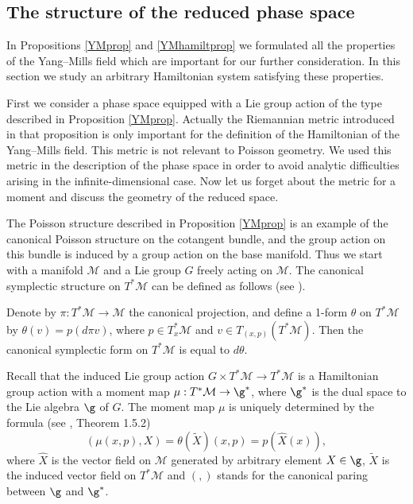 \documentclass{amsart}
\begin{document}


\subsection{The structure of the reduced phase space}\label{redcoord}



In Propositions \ref{YMprop} and \ref{YMhamiltprop} we formulated all the properties of the Yang--Mills field which are important for our further consideration. In this section we study an arbitrary Hamiltonian system satisfying these properties.

First we consider a phase space equipped with a Lie group action of the type
described in Proposition \ref{YMprop}. Actually
the Riemannian metric introduced in that proposition is only important for the definition of the Hamiltonian of the Yang--Mills field. This metric is not relevant to Poisson geometry. We used this metric in the description of the phase space in order to avoid analytic difficulties arising in the infinite-dimensional case. Now let us forget about the metric for a moment and discuss the geometry of the reduced space.

The Poisson structure described in Proposition \ref{YMprop} is an example of
the canonical Poisson structure on the cotangent bundle, and the group action
on this bundle is induced by a group action on the base manifold.
Thus we start with a manifold $\mathcal{M}$ and a Lie group
$G$ freely acting on $\mathcal{M}$. The canonical symplectic structure on $T^*\mathcal{M}$
can be defined as follows (see \cite{A}).

Denote by $\pi:T^*\mathcal{M}\rightarrow \mathcal{M}$ the
canonical projection, and define a 1-form $\theta$ on $T^*\mathcal{M}$ by
$\theta (v)=p(d\pi v)$,
where $p\in T_x^*\mathcal{M}$ and $v\in T_{(x,p)}(T^*\mathcal{M})$. Then the canonical
symplectic form on $T^*\mathcal{M}$ is equal to $d\theta$.

Recall that the induced Lie group action
$G\times T^*\mathcal{M}\rightarrow T^*\mathcal{M}$ is a Hamiltonian group action
with a moment map $\mu:T^*\mathcal{M}\rightarrow \g^*$, where $\g^*$ is the
dual space to the Lie algebra $\g$ of $G$. The moment map $\mu$ is
uniquely determined by the formula (see \cite{Per}, Theorem 1.5.2)
\begin{equation}\label{mom}
(\mu(x,p),X)=\theta ({\widetilde{X}})(x,p)=p(\widehat X(x)),
\end{equation}
where $\widehat{X}$ is the vector field on
$\mathcal{M}$ generated by arbitrary element $X\in \g$, ${\widetilde X}$ is the
induced vector field on $T^*\mathcal{M}$ and $(,)$ stands for the
canonical paring between $\g$ and $\g^*$.
\end{document}
